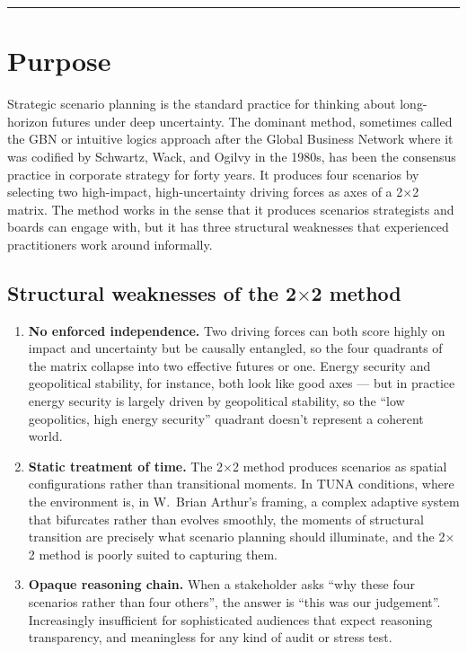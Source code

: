 \documentclass[11pt,a4paper]{article}
\begin{document}
\vfill
\hrule
\vspace{0.5em}
\newpage

\tableofcontents
\newpage

\section{Purpose}

Strategic scenario planning is the standard practice for thinking about long-horizon futures under deep uncertainty. The dominant method, sometimes called the GBN or intuitive logics approach after the Global Business Network where it was codified by Schwartz, Wack, and Ogilvy in the 1980s, has been the consensus practice in corporate strategy for forty years. It produces four scenarios by selecting two high-impact, high-uncertainty driving forces as axes of a 2$\times$2 matrix. The method works in the sense that it produces scenarios strategists and boards can engage with, but it has three structural weaknesses that experienced practitioners work around informally.

\subsection{Structural weaknesses of the 2$\times$2 method}

\begin{enumerate}[leftmargin=*]
  \item \textbf{No enforced independence.} Two driving forces can both score highly on impact and uncertainty but be causally entangled, so the four quadrants of the matrix collapse into two effective futures or one. Energy security and geopolitical stability, for instance, both look like good axes — but in practice energy security is largely driven by geopolitical stability, so the ``low geopolitics, high energy security'' quadrant doesn't represent a coherent world.
  \item \textbf{Static treatment of time.} The 2$\times$2 method produces scenarios as spatial configurations rather than transitional moments. In TUNA conditions, where the environment is, in W.\ Brian Arthur's framing, a complex adaptive system that bifurcates rather than evolves smoothly, the moments of structural transition are precisely what scenario planning should illuminate, and the 2$\times$2 method is poorly suited to capturing them.
  \item \textbf{Opaque reasoning chain.} When a stakeholder asks ``why these four scenarios rather than four others'', the answer is ``this was our judgement''. Increasingly insufficient for sophisticated audiences that expect reasoning transparency, and meaningless for any kind of audit or stress test.
\end{enumerate}
\end{document}
